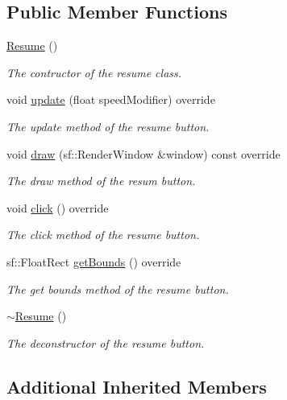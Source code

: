 \subsection*{Public Member Functions}
\begin{DoxyCompactItemize}
\item 
\hyperlink{class_resume_a71d23f61d7eb1560a918f6b3bf65fdc5}{Resume} ()
\begin{DoxyCompactList}\small\item\em The contructor of the resume class. \end{DoxyCompactList}\item 
void \hyperlink{class_resume_a79207ae2fa394f8a2d0754fef119854d}{update} (float speed\+Modifier) override
\begin{DoxyCompactList}\small\item\em The update method of the resume button. \end{DoxyCompactList}\item 
void \hyperlink{class_resume_af9fd5da781978db46173f99dd243fbaa}{draw} (sf\+::\+Render\+Window \&window) const override
\begin{DoxyCompactList}\small\item\em The draw method of the resum button. \end{DoxyCompactList}\item 
void \hyperlink{class_resume_af0fcbeeebd7efae59d5a9d3835270649}{click} () override
\begin{DoxyCompactList}\small\item\em The click method of the resume button. \end{DoxyCompactList}\item 
sf\+::\+Float\+Rect \hyperlink{class_resume_a69b21676eb0bac0c5b19aee42ca05ca1}{get\+Bounds} () override
\begin{DoxyCompactList}\small\item\em The get bounds method of the resume button. \end{DoxyCompactList}\item 
\hyperlink{class_resume_a86b302420dc26041de719f14ce6e6621}{$\sim$\+Resume} ()
\begin{DoxyCompactList}\small\item\em The deconstructor of the resume button. \end{DoxyCompactList}\end{DoxyCompactItemize}
\subsection*{Additional Inherited Members}


